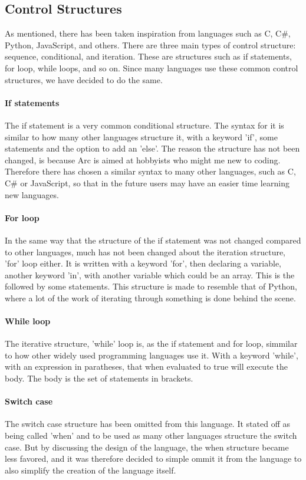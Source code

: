\subsection{Control Structures}
As mentioned, there has been taken inspiration from languages such as C, C\#, Python, JavaScript, and others. There are three main types of control structure: sequence, conditional, and iteration. These are structures such as if statements, for loop, while loops, and so on. Since many languages use these common control structures, we have decided to do the same.

\paragraph*{If statements}
The if statement is a very common conditional structure. The syntax for it is similar to how many other languages structure it, with a keyword 'if', some statements and the option to add an 'else'. The reason the structure has not been changed, is because Arc is aimed at hobbyists who might me new to coding. Therefore there has chosen a similar syntax to many other languages, such as C, C\# or JavaScript, so that in the future users may have an easier time learning new languages.

\paragraph*{For loop}
In the same way that the structure of the if statement was not changed compared to other languages, much has not been changed about the iteration structure, 'for' loop either. It is written with a keyword 'for', then declaring a variable, another keyword 'in', with another variable which could be an array. This is the followed by some statements.
This structure is made to resemble that of Python, where a lot of the work of iterating through something is done behind the scene.

\paragraph*{While loop}
The iterative structure, 'while' loop is, as the if statement and for loop, simmilar to how other widely used programming languages use it. With a keyword 'while', with an expression in paratheses, that when evaluated to true will execute the body. The body is the set of statements in brackets. 

\paragraph*{Switch case}
The switch case structure has been omitted from this language. It stated off as being called 'when' and to be used as many other languages structure the switch case. But by discussing the design of the language, the when structure became less favored, and it was therefore decided to simple ommit it from the language to also simplify the creation of the language itself.

